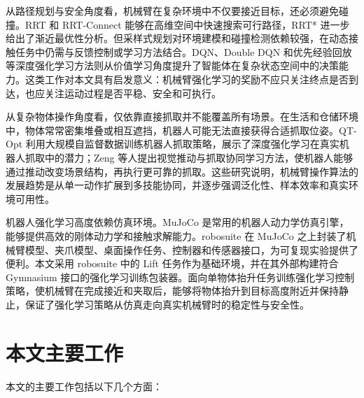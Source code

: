 \documentclass[
    type = bachelor,
    oneside,
    fontset = fandol
]{njuthesis}
\begin{document}
从路径规划与安全角度看，机械臂在复杂环境中不仅要接近目标，还必须避免碰撞。RRT 和 RRT-Connect 能够在高维空间中快速搜索可行路径\cite{lavalle2001randomized,kuffner2000rrtconnect}，RRT* 进一步给出了渐近最优性分析\cite{karaman2011sampling}。但采样式规划对环境建模和碰撞检测依赖较强，在动态接触任务中仍需与反馈控制或学习方法结合。DQN、Double DQN 和优先经验回放等深度强化学习方法则从价值学习角度提升了智能体在复杂状态空间中的决策能力\cite{mnih2015human,vanhasselt2016deep,schaul2015prioritized}。这类工作对本文具有启发意义：机械臂强化学习的奖励不应只关注终点是否到达，也应关注运动过程是否平稳、安全和可执行。

从复杂物体操作角度看，仅依靠直接抓取并不能覆盖所有场景。在生活和仓储环境中，物体常常密集堆叠或相互遮挡，机器人可能无法直接获得合适抓取位姿。QT-Opt 利用大规模自监督数据训练机器人抓取策略，展示了深度强化学习在真实机器人抓取中的潜力\cite{kalashnikov2018qtopt}；Zeng 等人提出视觉推动与抓取协同学习方法，使机器人能够通过推动改变场景结构，再执行更可靠的抓取\cite{zeng2018synergies}。这些研究说明，机械臂操作算法的发展趋势是从单一动作扩展到多技能协同，并逐步强调泛化性、样本效率和真实环境可用性。

机器人强化学习高度依赖仿真环境。MuJoCo 是常用的机器人动力学仿真引擎，能够提供高效的刚体动力学和接触求解能力\cite{todorov2012mujoco}。robosuite 在 MuJoCo 之上封装了机械臂模型、夹爪模型、桌面操作任务、控制器和传感器接口，为可复现实验提供了便利\cite{zhu2020robosuite}。本文采用 robosuite 中的 Lift 任务作为基础环境，并在其外部构建符合 Gymnasium 接口的强化学习训练包装器。面向单物体抬升任务训练强化学习控制策略，使机械臂在完成接近和夹取后，能够将物体抬升到目标高度附近并保持静止，保证了强化学习策略从仿真走向真实机械臂时的稳定性与安全性。

\section{本文主要工作}

本文的主要工作包括以下几个方面：
\end{document}
